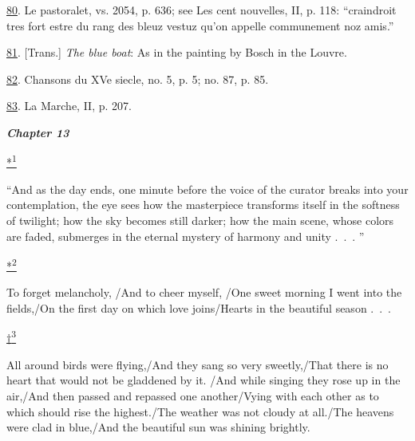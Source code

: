 \protect\hypertarget{23_NOTES.xhtmlux5cux23id_315}{\protect\hyperlink{20_ILLUSTRATIONS_FOLLOW_PAGE.xhtmlux5cux23id_314}{80}}.
Le pastoralet, vs. 2054, p. 636; see Les cent nouvelles, II, p. 118:
``craindroit tres fort estre du rang des bleuz vestuz qu'on appelle
communement noz amis.''

\protect\hypertarget{23_NOTES.xhtmlux5cux23id_313}{\protect\hyperlink{20_ILLUSTRATIONS_FOLLOW_PAGE.xhtmlux5cux23id_312}{81}}.
{[}Trans.{]} \emph{The blue boat}: As in the painting by Bosch in the
Louvre.

\protect\hypertarget{23_NOTES.xhtmlux5cux23id_311}{\protect\hyperlink{20_ILLUSTRATIONS_FOLLOW_PAGE.xhtmlux5cux23id_310}{82}}.
Chansons du XVe siecle, no. 5, p. 5; no. 87, p. 85.

\protect\hypertarget{23_NOTES.xhtmlux5cux23id_309}{\protect\hyperlink{20_ILLUSTRATIONS_FOLLOW_PAGE.xhtmlux5cux23id_308}{83}}.
La Marche, II, p. 207.

\textbf{\emph{Chapter 13}}

\protect\hypertarget{23_NOTES.xhtmlux5cux23id_2354}{\protect\hyperlink{21_Chapter_Thirteen__IMAGE_AND_WORD.xhtmlux5cux23id_2353}{*\textsuperscript{1}}}
``And as the day ends, one minute before the voice of the curator breaks
into your contemplation, the eye sees how the masterpiece transforms
itself in the softness of twilight; how the sky becomes still darker;
how the main scene, whose colors are faded, submerges in the eternal
mystery of harmony and unity .~.~. ''

\protect\hypertarget{23_NOTES.xhtmlux5cux23id_2708}{\protect\hyperlink{21_Chapter_Thirteen__IMAGE_AND_WORD.xhtmlux5cux23id_2707}{*\textsuperscript{2}}}
To forget melancholy, /And to cheer myself, /One sweet morning I went
into the fields,/On the first day on which love joins/Hearts in the
beautiful season .~.~.

\protect\hypertarget{23_NOTES.xhtmlux5cux23id_2710}{\protect\hyperlink{21_Chapter_Thirteen__IMAGE_AND_WORD.xhtmlux5cux23id_2709}{†\textsuperscript{3}}}
All around birds were flying,/And they sang so very sweetly,/That there
is no heart that would not be gladdened by it. /And while singing they
rose up in the air,/And then passed and repassed one another/Vying with
each other as to which should rise the highest./The weather was not
cloudy at all./The heavens were clad in blue,/And the beautiful sun was
shining brightly.

